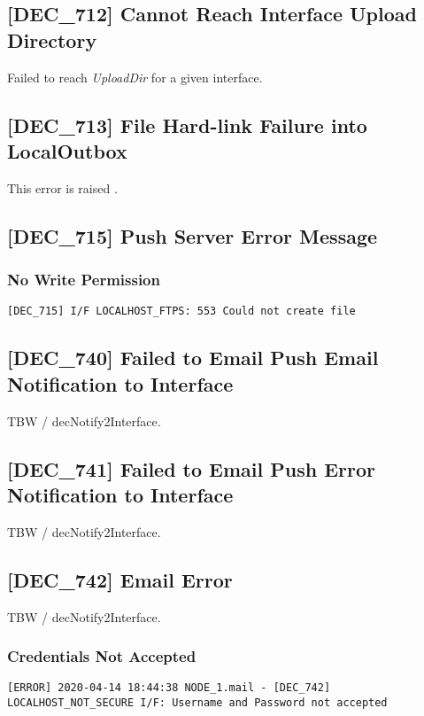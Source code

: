 \documentclass[dec_sum_main.tex]{subfiles}
\begin{document}
\label{DEC712}
\subsection{[DEC\_712] Cannot Reach Interface Upload Directory}
Failed to reach \textit{UploadDir} for a given interface.

\label{DEC713}
\subsection{[DEC\_713] File Hard-link Failure into LocalOutbox}
This error is raised .

\label{DEC715}
\subsection{[DEC\_715] Push Server Error Message}

\subsubsection{No Write Permission }
\begin{verbatim}
[DEC_715] I/F LOCALHOST_FTPS: 553 Could not create file
\end{verbatim}

\label{DEC740}
\subsection{[DEC\_740] Failed to Email Push Email Notification to Interface}
TBW / decNotify2Interface.

\label{DEC741}
\subsection{[DEC\_741] Failed to Email Push Error Notification to Interface}
TBW / decNotify2Interface.

\label{DEC742}
\subsection{[DEC\_742] Email Error}
TBW / decNotify2Interface.

\subsubsection{Credentials Not Accepted}

\begin{verbatim}
[ERROR] 2020-04-14 18:44:38 NODE_1.mail - [DEC_742] LOCALHOST_NOT_SECURE I/F: Username and Password not accepted
\end{verbatim}
\end{document}
